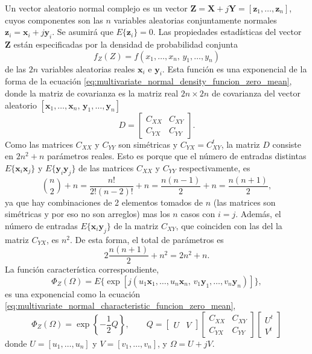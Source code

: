 \documentclass[a4paper]{report}
\newcommand{\X}{\mathbf{X}}
\newcommand{\Y}{\mathbf{Y}}
\newcommand{\Z}{\mathbf{Z}}
\newcommand{\x}{\mathbf{x}}
\newcommand{\y}{\mathbf{y}}
\newcommand{\z}{\mathbf{z}}
\begin{document}
Un vector aleatorio normal complejo es un vector \(\Z=\X+j\Y=[\z_1,\dots,\z_n]\), cuyos componentes son las \(n\) variables aleatorias conjuntamente normales \(\z_i=\x_i+j\y_i\). Se asumirá que \(E\{\z_i\}=0\). Las propiedades estadísticas del vector \(\Z\) están especificadas por la densidad de probabilidad conjunta
\[
 f_Z(Z)=f(x_1,\dots,x_n,\,y_1,\dots,y_n)
\]
de las \(2n\) variables aleatorias reales \(\x_i\) e \(\y_i\). Esta función es una exponencial de la forma de la ecuación \ref{eq:multivariate_normal_density_funcion_zero_mean}, donde la matriz de covarianza es la matriz real \(2n\times2n\) de covarianza del vector aleatorio \([\x_1,\dots,\x_n,\,\y_1,\dots,\y_n]\)
\[
 D=\begin{bmatrix}
   C_{XX} & C_{XY} \\
   C_{YX} & C_{YY}
\end{bmatrix}.
\]
Como las matrices \(C_{XX}\) y \(C_{YY}\) son simétricas y \(C_{YX}=C_{XY}^t\), la matriz \(D\) consiste en \(2n^2+n\) parámetros reales. Esto es porque que el número de entradas distintas \(E\{\x_i\x_j\}\) y \(E\{\y_i\y_j\}\) de las matrices \(C_{XX}\) y \(C_{YY}\) respectivamente, es
\[
 \binom{n}{2}+n=\frac{n!}{2!(n-2)!}+n=\frac{n(n-1)}{2}+n=\frac{n(n+1)}{2},
\]
ya que hay combinaciones de 2 elementos tomados de \(n\) (las matrices son simétricas y por eso no son arreglos) mas los \(n\) casos con \(i=j\). Además, el número de entradas \(E\{\x_i\y_j\}\) de la matriz \(C_{XY}\), que coinciden con las del la matriz \(C_{YX}\), es \(n^2\). De esta forma, el total de parámetros es
\[
 2\frac{n(n+1)}{2}+n^2=2n^2+n.
\]
La función característica correspondiente,
\[
 \Phi_Z(\Omega)=E\{\exp[j(u_1\x_1,\dots,u_n\x_n,\,v_1\y_1,\dots,v_n\y_n)]\},
\]
es una exponencial como la ecuación \ref{eq:multivariate_normal_characteristic_funcion_zero_mean},
\begin{equation}\label{eq:complex_multivariate_normal_characteristic_funcion_zero_mean}
 \Phi_Z(\Omega)=\exp\left\{-\frac{1}{2}Q\right\},
 \qquad
 Q=
 \begin{bmatrix}
   U & V
 \end{bmatrix}
 \begin{bmatrix}
   C_{XX} & C_{XY} \\
   C_{YX} & C_{YY}
 \end{bmatrix}
 \begin{bmatrix}
   U^t\\
   V^t
 \end{bmatrix}
\end{equation}
donde \(U=[u_1,\dots,u_n]\) y \(V=[v_1,\dots,v_n]\), y \(\Omega=U+jV\).
\end{document}
